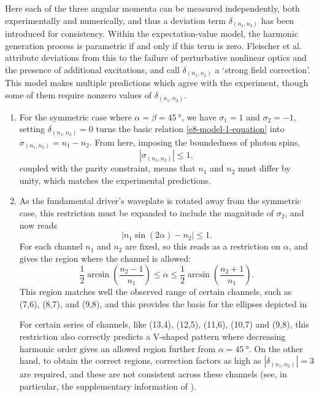 Here each of the three angular momenta can be measured independently, both experimentally and numerically, and thus a deviation term $\delta_{(n_1,n_2)}$ has been introduced for consistency. Within the expectation-value model, the harmonic generation process is parametric if and only if this term is zero. Fleischer et al. attribute deviations from this to the failure of perturbative nonlinear optics and the presence of additional excitations, and call $\delta_{(n_1,n_2)}$ a `strong field correction'. This model makes multiple predictions which agree with the experiment, though some of them require nonzero values of $\delta_{(n_1,n_2)}$.

\begin{enumerate}[label=(\roman*)]

 \item
 For the symmetric case where $\alpha=\beta=\SI{45}{\degree}$, we have $\sigma_1=1$ and $\sigma_2=-1$, setting \mbox{$\delta_{(n_1,n_2)}=0$} turns the basic relation \eqref{e8-model-1-equation} into $\sigma_{(n_1,n_2)}=n_1-n_2$. From here, imposing the boundedness of photon spins, 
 \begin{equation}
 |\sigma_{(n_1,n_2)}|\leq 1,
 \label{e8-photon-spin-boundedness}
 \end{equation} coupled with the parity constraint, means that $n_1$ and $n_2$ must differ by unity, which matches the experimental predictions.
 
 \item
 As the fundamental driver's waveplate is rotated away from the symmetric case, this restriction must be expanded to include the magnitude of $\sigma_2$, and now reads
 \begin{equation}
 |n_1\sin(2\alpha) - n_2| \leq 1.
 \label{e8-channel-existence-region}
 \end{equation}
 For each channel $n_1$ and $n_2$ are fixed, so this reads as a restriction on $\alpha$, and gives the region where the channel is allowed:
 \begin{equation}
 \frac12\arcsin\left(\frac{n_2-1}{n_1}\right)\leq\alpha\leq\frac12\arcsin\left(\frac{n_2+1}{n_1}\right).
 \label{e8-channel-existence-region-unbundled}
 \end{equation}
 This region matches well the observed range of certain channels, such as (7,6), (8,7), and (9,8), and this provides the basis for the ellipses depicted in 
 
 For certain series of channels, like (13,4), (12,5), (11,6), (10,7) and (9,8), this restriction also correctly predicts a V-shaped pattern where decreasing harmonic order gives an allowed region further from $\alpha=\SI{45}{\degree}$. On the other hand, to obtain the correct regions, correction factors as high as $|\delta_{(n_1,n_2)}|=3$ are required, and these are not consistent across these channels (see, in particular, the supplementary information of ).
 

\end{enumerate}
